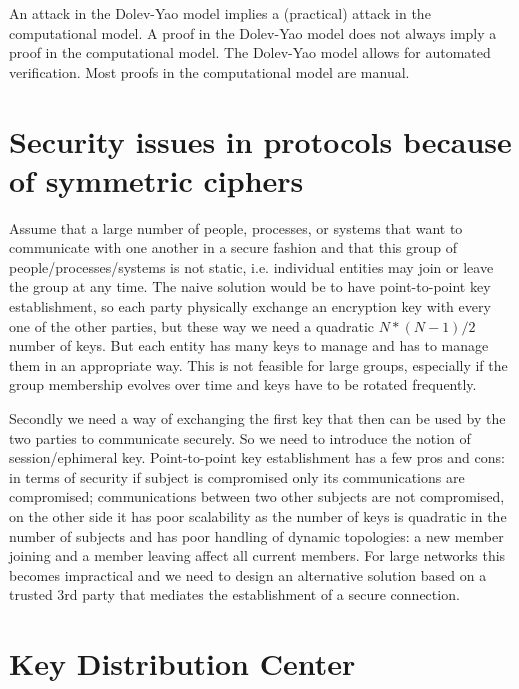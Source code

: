 An attack in the Dolev-Yao model implies a (practical) attack in the computational model. A proof in the Dolev-Yao model does not always imply a proof in the computational model.
The Dolev-Yao model allows for automated verification. Most proofs in the computational model are manual.



\section{Security issues in protocols because of symmetric ciphers}

Assume that a large number of people, processes, or systems that want to communicate with one another in a secure fashion and that this group of people/processes/systems is not static, i.e. individual entities may join or leave the group at any time. The naive solution would be to have point-to-point key establishment, so each party physically exchange an encryption key with every one of the other parties, but these way we need a quadratic $N*(N-1) / 2$ number of keys. But each entity has many keys to manage and has to manage them in an appropriate way. This is not feasible for large groups, especially if the group membership evolves over time and keys have to be rotated frequently.

Secondly we need a way of exchanging the first key that then can be used by the two parties to communicate securely. So we need to introduce the notion of session/ephimeral key. Point-to-point key establishment has a few pros and cons: in terms of security if subject is compromised only its communications are compromised; communications between two other subjects are not compromised, on the other side it has poor scalability as the number of keys is quadratic in the number of subjects and has poor handling of dynamic topologies: a new member joining and a member leaving affect all current members. For large networks this becomes impractical and we need to design an alternative solution based on a trusted 3rd party that mediates the establishment of a secure connection.

\section{Key Distribution Center}

